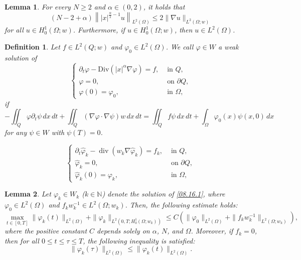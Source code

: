 \documentclass[10pt,a4paper]{amsart}
\newtheorem{lemma}{Lemma}
\newtheorem{definition}{Definition}
\DeclareMathOperator{\Div}{div}
\def\Om{\Omega}
\def\pt{\partial}
\def\vp{\varphi}
\def\wh{\widehat}
\begin{document}
\begin{lemma}\label{08.15.L1}
For every $N \geq 2$ and $\alpha \in (0, 2)$, it holds that
\begin{equation*}
(N - 2 + \alpha)\left\||x|^{\frac{\alpha}{2} - 1}u\right\|_{L^2(\Omega)} \leq 2\|\nabla u\|_{L^2(\Omega; w)}
\end{equation*}
for all $u \in H_0^1(\Omega; w)$. Furthermore, if $u \in H_0^1(\Omega; w)$, then $u \in L^2(\Omega)$.
\end{lemma}

\begin{definition}\label{08.16.D1}
Let $f \in L^2(Q; w)$ and $\varphi_0 \in L^2(\Omega)$. We call $\varphi \in W$ a \emph{weak solution} of
\begin{equation}\label{03.01.1}
\begin{cases}
\partial_t \varphi - \mathrm{Div}(|x|^\alpha \nabla \varphi) = f, &\text{ in } Q, \\
\varphi = 0, &\text{ on } \partial Q, \\
\varphi(0) = \varphi_0, &\text{ in } \Omega,
\end{cases}
\end{equation}
if
\begin{equation*}
-\iint_Q \varphi \partial_t \psi \, dx \, dt + \iint_Q (\nabla \varphi \cdot \nabla \psi)w \, dx \, dt = \iint_Q f \psi \, dx \, dt + \int_\Omega \varphi_0(x)\psi(x, 0) \, dx
\end{equation*}
for any $\psi \in W$ with $\psi(T) = 0$.
\end{definition}

\begin{equation}\label{08.16.1}
\begin{cases}
\pt_t\wh \vp_k - \Div(w_k\nabla\wh \vp_k) = f_k, &\text{ in } Q, \\
\wh \vp_k = 0, &\text{ on } \pt Q, \\
\wh \vp_k(0) = \vp_k, & \text{ in } \Om,
\end{cases}
\end{equation}

  \begin{lemma}\label{08.22.L1}
Let $\varphi_k \in W_k$ ($k \in \mathbb{N}$) denote the solution of \eqref{08.16.1}, where $\varphi_0 \in L^2(\Omega)$ and $f_k w_k^{-1} \in L^2(\Omega; w_k)$. Then, the following estimate holds:
\begin{equation*}
\max_{t \in [0,T]} \|\varphi_k(t)\|_{L^2(\Omega)} + \|\varphi_k\|_{L^2(0,T; H_0^1(\Omega; w_k))} \leq C \left( \|\varphi_0\|_{L^2(\Omega)} + \|f_k w_k^{-1}\|_{L^2(\Omega; w_k)} \right),
\end{equation*}
where the positive constant $C$ depends solely on $\alpha$, $N$, and $\Omega$.
Moreover, if $f_k = 0$, then for all $0 \leq t \leq \tau \leq T$, the following inequality is satisfied:
\begin{equation*}
\|\varphi_k(\tau)\|_{L^2(\Omega)} \leq \|\varphi_k(t)\|_{L^2(\Omega)}.
\end{equation*}
\end{lemma}
\end{document}
